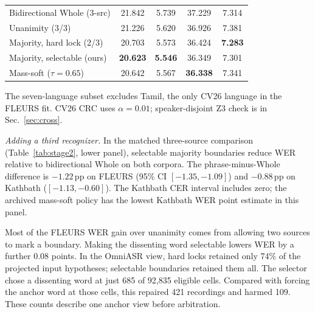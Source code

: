 \documentclass[conference,letterpaper]{IEEEtran}
\newcommand{\pp}{\ensuremath{\,\mathrm{pp}}}
\newcommand{\crc}{\textup{\textsc{CRC}}}
\begin{document}
\begin{table}[t]
\begin{tabular*}{\columnwidth}{@{\extracolsep{\fill}}lcccc@{}}
Bidirectional Whole (3-src) & 21.842 & 5.739 & 37.229 & 7.314\\
Unanimity (3/3) & 21.226 & 5.620 & 36.926 & 7.381\\
Majority, hard lock (2/3) & 20.703 & 5.573 & 36.424 & \textbf{7.283}\\
Majority, selectable (ours) & \textbf{20.623} & \textbf{5.546} & 36.349 & 7.301\\
Mass-soft ($\tau=0.65$) & 20.642 & 5.567 & \textbf{36.338} & 7.341\\
\bottomrule\end{tabular*}
\par\smallskip\raggedright\footnotesize The seven-language subset excludes Tamil, the only CV26 language in the FLEURS fit. CV26 \crc{} uses $\alpha=0.01$; speaker-disjoint Z3 check is in Sec.~\ref{sec:cross}.
\end{table}

\emph{Adding a third recognizer.} In the matched three-source comparison (Table~\ref{tab:stage2}, lower panel), selectable majority boundaries reduce WER relative to bidirectional Whole on both corpora. The phrase-minus-Whole difference is $-1.22\pp$ on FLEURS (95\% CI $[-1.35,-1.09]$) and $-0.88\pp$ on Kathbath ($[-1.13,-0.60]$). The Kathbath CER interval includes zero; the archived mass-soft policy has the lowest Kathbath WER point estimate in this panel.

Most of the FLEURS WER gain over unanimity comes from allowing two sources to mark a boundary. Making the dissenting word selectable lowers WER by a further 0.08 points. In the OmniASR view, hard locks retained only 74\% of the projected input hypotheses; selectable boundaries retained them all. The selector chose a dissenting word at just 685 of 92,835 eligible cells. Compared with forcing the anchor word at those cells, this repaired 421 recordings and harmed 109. These counts describe one anchor view before arbitration.
\end{document}

